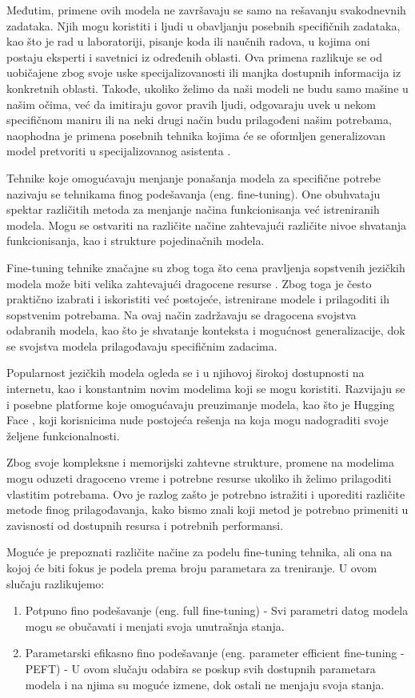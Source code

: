 \documentclass[12pt,oneside]{memoir}
\begin{document}
Međutim, primene ovih modela ne završavaju se samo na rešavanju svakodnevnih zadataka. Njih mogu koristiti i ljudi u obavljanju posebnih specifičnih zadataka, kao što je rad u laboratoriji, pisanje koda ili naučnih radova, u kojima oni postaju eksperti i savetnici iz određenih oblasti. Ova primena razlikuje se od uobičajene zbog svoje uske specijalizovanosti ili manjka dostupnih informacija iz konkretnih oblasti. Takođe, ukoliko želimo da naši modeli ne budu samo mašine u našim očima, već da imitiraju govor pravih ljudi, odgovaraju uvek u nekom specifičnom maniru ili na neki drugi način budu prilagođeni našim potrebama, naophodna je primena posebnih tehnika kojima će se oformljen generalizovan model pretvoriti u specijalizovanog asistenta \cite{LLMCustomization}.

Tehnike koje omogućavaju menjanje ponašanja modela za specifične potrebe nazivaju se tehnikama finog podešavanja (eng. fine-tuning). One obuhvataju spektar različitih metoda za menjanje načina funkcionisanja već istreniranih modela. Mogu se ostvariti na različite načine zahtevajući različite nivoe shvatanja funkcionisanja, kao i strukture pojedinačnih modela. 

Fine-tuning tehnike značajne su zbog toga što cena pravljenja sopstvenih jezičkih modela može biti velika zahtevajući dragocene resurse \cite{CostOfLLMs}. Zbog toga je često praktično izabrati i iskoristiti već postojeće, istrenirane modele i prilagoditi ih sopstvenim potrebama. Na ovaj način zadržavaju se dragocena svojstva odabranih modela, kao što je shvatanje konteksta i mogućnost generalizacije, dok se svojstva modela prilagođavaju specifičnim zadacima. 

Popularnost jezičkih modela ogleda se i u njihovoj širokoj dostupnosti na internetu, kao i konstantnim novim modelima koji se mogu koristiti. Razvijaju se i posebne platforme koje omogućavaju preuzimanje modela, kao što je Hugging Face \cite{Huggingface2023}, koji korisnicima nude postojeća rešenja na koja mogu nadograditi svoje željene funkcionalnosti.

Zbog svoje kompleksne i memorijski zahtevne strukture, promene na modelima mogu oduzeti dragoceno vreme i potrebne resurse ukoliko ih želimo prilagoditi vlastitim potrebama. Ovo je razlog zašto je potrebno istražiti i uporediti različite metode finog prilagođavanja, kako bismo znali koji metod je potrebno primeniti u zavisnosti od dostupnih resursa i potrebnih performansi. 

Moguće je prepoznati različite načine za podelu fine-tuning tehnika, ali ona na kojoj će biti fokus je podela prema broju parametara za treniranje. U ovom slučaju razlikujemo:
\begin{enumerate}
	\item Potpuno fino podešavanje (eng. full fine-tuning) - Svi parametri datog modela mogu se obučavati i menjati svoja unutrašnja stanja.
	\item Parametarski efikasno fino podešavanje (eng. parameter efficient fine-tuning - PEFT)\cite{PEFTArticle} - U ovom slučaju odabira se poskup svih dostupnih parametara modela i na njima su moguće izmene, dok ostali ne menjaju svoja stanja.
\end{enumerate}
\end{document}
